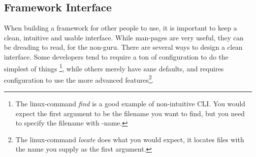 \documentclass[a4paper]{article}
\begin{document}
\newpage
\subsection{Framework Interface}
When building a framework for other people to use, it is important to keep a clean, intuitive and usable interface. While man-pages are very useful, they can be dreading to read, for the non-guru. There are several ways to design a clean interface. Some developers tend to require a ton of configuration to do the simplest of things \footnote{The linux-command \textit{find} is a good example of non-intuitive CLI. You would expect the first argument to be the filename you want to find, but you need to specify the filename with -name.}, while others merely have sane defaults, and requires configuration to use the more advanced features\footnote{The linux-command \textit{locate} does what you would expect, it locates files with the name you supply as the first argument.}.\\
\end{document}
